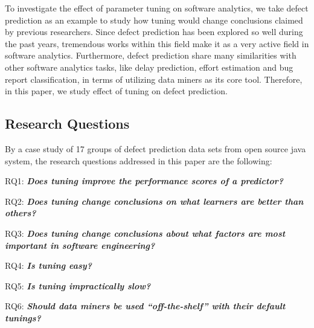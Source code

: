 To investigate the effect of parameter tuning on software analytics, 
we take defect prediction as an example to study how tuning
would change conclusions claimed by previous researchers. 
Since defect prediction has been explored so well during
the past years, tremendous works within this field make it as a very 
active field in software analytics. Furthermore, defect prediction
share many similarities with other software analytics tasks, 
like delay prediction, effort estimation and bug report classification,
in terms of utilizing data miners as its core tool. 
Therefore, in this paper, we study effect of tuning on defect prediction.

\subsection{Research Questions}
By a case study of 17 groups of defect prediction data sets from open source java system,  the research questions addressed in this paper are the following:

\bi
\item RQ1: {\bf{\em Does   tuning    improve the performance scores of a predictor?}} %
\item RQ2: {\bf {\em Does tuning change conclusions on what learners are better than others?}} 
\item RQ3: {\bf {\em Does tuning change conclusions about what factors are most important in software engineering?}} %
\item  RQ4: {\bf {\em Is tuning easy?}} %
\item RQ5: {\bf {\em Is tuning impractically slow?}} %
\item RQ6: {\bf{\em Should data miners be used ``off-the-shelf'' with their default tunings?}}
\ei

